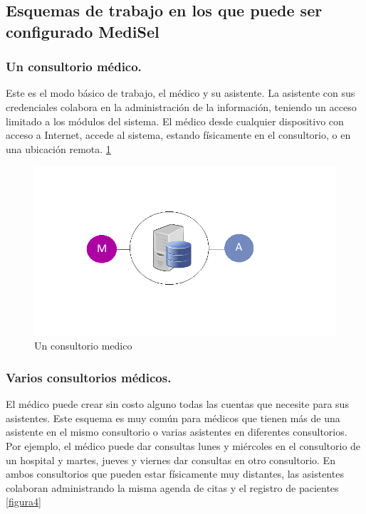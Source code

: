 \subsection{Esquemas de trabajo en los que puede ser configurado MediSel}

\subsubsection{Un consultorio médico.}
Este es el modo básico de trabajo, el médico y su asistente. La asistente con sus credenciales colabora en la administración de la información, teniendo un acceso limitado a los módulos del sistema. El médico desde cualquier dispositivo con acceso a Internet, accede al sistema, estando físicamente en el consultorio, o en una ubicación remota.\cite{esquemas} \ref{figura3}
\begin{figure}[h]
  \label{figura3}
  \centering
  \includegraphics[scale=.35]{lib/assets/3}
  \caption{Un consultorio medico}
\end{figure}




\subsubsection{Varios consultorios médicos.}
El médico puede crear sin costo alguno todas las cuentas que necesite para sus asistentes. Este esquema es muy común para médicos que tienen más de una asistente en el mismo consultorio o varias asistentes en diferentes consultorios. Por ejemplo, el médico puede dar consultas lunes y miércoles en el consultorio de un hospital y martes, jueves y viernes dar consultas en otro consultorio. En ambos consultorios que pueden estar físicamente muy distantes, las asistentes colaboran administrando la misma agenda de citas y el registro de pacientes \cite{esquemas} \ref{figura4}

